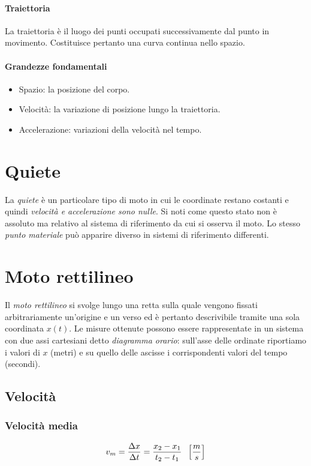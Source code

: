 \documentclass[class=book, crop=false, oneside, 12pt]{standalone}
\begin{document}
      \paragraph{Traiettoria}
      La traiettoria \`e il luogo dei punti occupati successivamente dal punto in movimento.
      Costituisce pertanto una curva continua nello spazio.
      \paragraph{Grandezze fondamentali}
      \begin{itemize}
        \item Spazio: la posizione del corpo.
        \item Velocit\`a: la variazione di posizione lungo la traiettoria.
        \item Accelerazione: variazioni della velocità nel tempo.
      \end{itemize}
\section{Quiete}
La \emph{quiete} è un particolare tipo di moto in cui le coordinate restano costanti e quindi \emph{velocità e accelerazione sono nulle}.
Si noti come questo stato non \`e assoluto ma relativo al sistema di riferimento da cui si osserva il moto.
Lo stesso \emph{punto materiale} può apparire diverso in sistemi di riferimento differenti.
\section{Moto rettilineo}
Il \emph{moto rettilineo} si svolge lungo una retta sulla quale vengono fissati arbitrariamente un'origine e un verso ed è pertanto descrivibile tramite una sola coordinata \(x(t)\).
Le misure ottenute possono essere rappresentate in un sistema con due assi cartesiani detto \emph{diagramma orario}: sull'asse delle ordinate riportiamo i valori di \(x\) (metri) e su quello delle ascisse i corrispondenti valori del tempo (secondi).

  \subsection{Velocità}
    \subsubsection{Velocit\`a media}
    \begin{equation}\label{velocita_media}
      v_m = \dfrac {\Delta x} {\Delta t} = \dfrac {x_2 - x_1} {t_2 - t_1} \hspace{0.2cm} \left[\dfrac {m} {s}\right]
    \end{equation}
\end{document}
